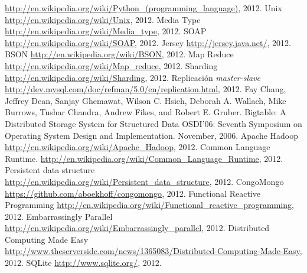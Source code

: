 \documentclass[a4paper,12pt,twoside]{report}
\begin{document}
\begin{thebibliography}{1}
  \newblock
  \url{http://en.wikipedia.org/wiki/Python_(programming_language)}, 2012.
  \newblock Unix
  \newblock \url{http://en.wikipedia.org/wiki/Unix}, 2012.
  \newblock Media Type
  \newblock \url{http://en.wikipedia.org/wiki/Media_type}, 2012.
  \newblock SOAP
  \newblock \url{http://en.wikipedia.org/wiki/SOAP}, 2012.
  \newblock Jersey
  \newblock \url{http://jersey.java.net/}, 2012.
  \newblock BSON
  \newblock \url{http://en.wikipedia.org/wiki/BSON}, 2012.
  \newblock Map Reduce
  \newblock \url{http://en.wikipedia.org/wiki/Map_reduce}, 2012.
  \newblock Sharding
  \newblock \url{http://en.wikipedia.org/wiki/Sharding}, 2012.
  \newblock Replicación \emph{master-slave}
  \newblock
  \url{http://dev.mysql.com/doc/refman/5.0/en/replication.html}, 2012.
  Fay Chang, Jeffrey Dean, Sanjay Ghemawat, Wilson C. Hsieh, Deborah A. Wallach, Mike Burrows, Tushar Chandra, Andrew Fikes, and Robert E. Gruber.
  \newblock Bigtable: A Distributed Storage System for Structured Data
  \newblock OSDI'06: Seventh Symposium on Operating System Design and
  Implementation. November, 2006.
  \newblock Apache Hadoop
  \newblock \url{http://en.wikipedia.org/wiki/Apache_Hadoop}, 2012.
  \newblock Common Language Runtime.
  \newblock
  \url{http://en.wikipedia.org/wiki/Common_Language_Runtime}, 2012.
  \newblock Persistent data structure
  \newblock
  \url{http://en.wikipedia.org/wiki/Persistent_data_structure}, 2012.
  \newblock CongoMongo
  \url{https://github.com/aboekhoff/congomongo}, 2012.
  \newblock Functional Reactive Programming
  \url{http://en.wikipedia.org/wiki/Functional_reactive_programming},
  2012.
  \newblock Embarrassingly Parallel
  \url{http://en.wikipedia.org/wiki/Embarrassingly_parallel}, 2012.
  \newblock Distributed Computing Made Easy
  \url{http://www.theserverside.com/news/1365083/Distributed-Computing-Made-Easy},
  2012.
  \newblock SQLite
  \newblock \url{http://www.sqlite.org/}, 2012.
\end{thebibliography}
\end{document}
